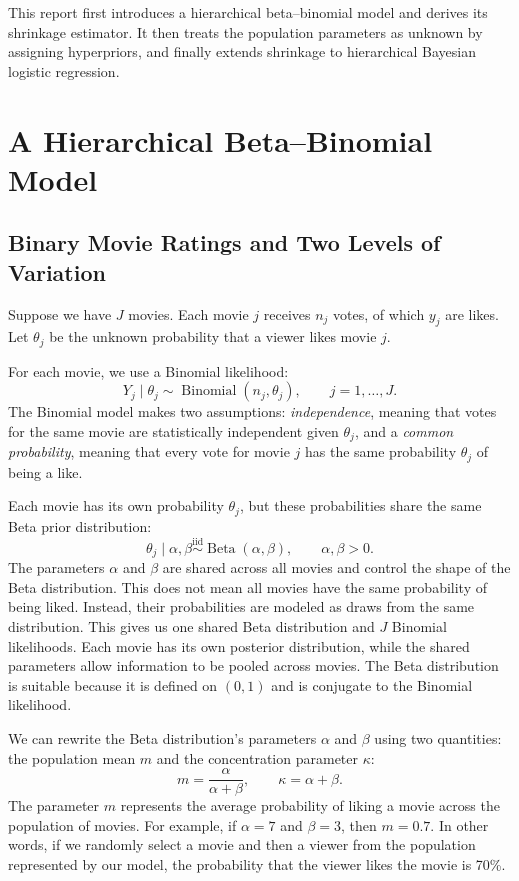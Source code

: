 \documentclass[11pt,a4paper]{article}
\newcommand{\BetaD}{\operatorname{Beta}}
\newcommand{\Bin}{\operatorname{Binomial}}
\begin{document}
This report first introduces a hierarchical beta--binomial model and derives its shrinkage estimator. It then treats the population parameters as unknown by assigning hyperpriors, and finally extends shrinkage to hierarchical Bayesian logistic regression.

\section{A Hierarchical Beta--Binomial Model}
\subsection{Binary Movie Ratings and Two Levels of Variation}

Suppose we have $J$ movies. Each movie $j$ receives $n_j$ votes, of which $y_j$ are likes. Let $\theta_j$ be the unknown probability that a viewer likes movie $j$.

For each movie, we use a Binomial likelihood:
\begin{equation}
Y_j \mid \theta_j \sim \Bin(n_j,\theta_j),
\qquad j=1,\ldots,J.
\label{eq:binomial}
\end{equation}
The Binomial model makes two assumptions: \emph{independence}, meaning that votes for the same movie are statistically independent given $\theta_j$, and a \emph{common probability}, meaning that every vote for movie $j$ has the same probability $\theta_j$ of being a like.

Each movie has its own probability $\theta_j$, but these probabilities share the same Beta prior distribution:
\begin{equation}
\theta_j \mid \alpha,\beta
\overset{\mathrm{iid}}{\sim} \BetaD(\alpha,\beta),
\qquad \alpha,\beta>0.
\label{eq:beta-group}
\end{equation}
The parameters $\alpha$ and $\beta$ are shared across all movies and control the shape of the Beta distribution. This does not mean all movies have the same probability of being liked. Instead, their probabilities are modeled as draws from the same distribution. This gives us one shared Beta distribution and $J$ Binomial likelihoods. Each movie has its own posterior distribution, while the shared parameters allow information to be pooled across movies. The Beta distribution is suitable because it is defined on $(0,1)$ and is conjugate to the Binomial likelihood.

We can rewrite the Beta distribution's parameters $\alpha$ and
$\beta$ using two quantities: the population mean $m$ and
the concentration parameter $\kappa$:
\begin{equation}
m=\frac{\alpha}{\alpha+\beta},
\qquad
\kappa=\alpha+\beta.
\label{eq:mean-concentration}
\end{equation}
The parameter $m$ represents the average probability of liking a movie across the population of movies. For example,
if $\alpha=7$ and $\beta=3$, then $m=0.7$. In other words, if we randomly select a movie and then a viewer from the population represented by our model, the probability that the viewer likes the movie is 70\%.
\end{document}
